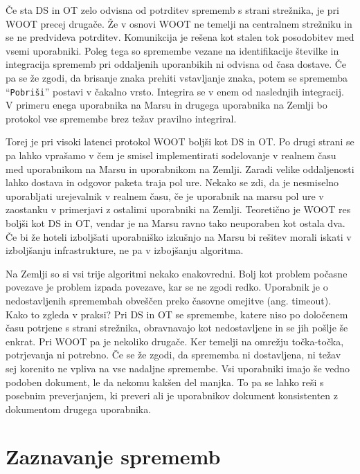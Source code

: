 \documentclass[a4paper, 12pt, twoside]{book}
\begin{document}
Če sta DS in OT zelo odvisna od potrditev sprememb s strani strežnika, je pri WOOT precej drugače. Že v osnovi WOOT ne temelji na centralnem strežniku in se ne predvideva potrditev. Komunikcija je rešena kot stalen tok posodobitev med vsemi uporabniki. Poleg tega so spremembe vezane na identifikacije številke in integracija sprememb pri oddaljenih uporanbikih ni odvisna od časa dostave. Če pa se že zgodi, da brisanje znaka prehiti vstavljanje znaka, potem se sprememba “{\tt Pobriši}” postavi v čakalno vrsto. Integrira se v enem od naslednjih integracij. V primeru enega uporabnika na Marsu in drugega uporabnika na Zemlji bo protokol vse spremembe brez težav pravilno integriral.

Torej je pri visoki latenci protokol WOOT boljši kot DS in OT. Po drugi strani se pa lahko vprašamo v čem je smisel implementirati sodelovanje v realnem času med uporabnikom na Marsu in uporabnikom na Zemlji. Zaradi velike oddaljenosti lahko dostava in odgovor paketa traja pol ure. Nekako se zdi, da je nesmiselno uporabljati urejevalnik v realnem času, če je uporabnik na marsu pol ure v zaostanku v primerjavi z ostalimi uporabniki na Zemlji. Teoretično je WOOT res boljši kot DS in OT, vendar je na Marsu ravno tako neuporaben kot ostala dva. Če bi že hoteli izboljšati uporabniško izkušnjo na Marsu bi rešitev morali iskati v izboljšanju infrastrukture, ne pa v izbojšanju algoritma.

Na Zemlji so si vsi trije algoritmi nekako enakovredni. Bolj kot problem počasne povezave je problem izpada povezave, kar se ne zgodi redko. Uporabnik je o nedostavljenih spremembah obveščen preko časovne omejitve (ang. timeout). Kako to zgleda v praksi? Pri DS in OT se spremembe, katere niso po določenem času potrjene s strani strežnika, obravnavajo kot nedostavljene in se jih pošlje še enkrat. Pri WOOT pa je nekoliko drugače. Ker temelji na omrežju točka-točka, potrjevanja ni potrebno. Če se že zgodi, da sprememba ni dostavljena, ni težav sej korenito ne vpliva na vse nadaljne spremembe. Vsi uporabniki imajo še vedno podoben dokument, le da nekomu kakšen del manjka. To pa se lahko reši s posebnim preverjanjem, ki preveri ali je uporabnikov dokument konsistenten z dokumentom drugega uporabnika.

\section{Zaznavanje sprememb}
\end{document}

